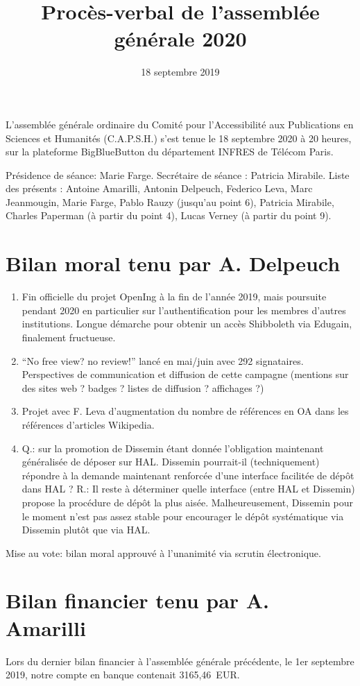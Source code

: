 \documentclass[a4paper]{article}
\title{Procès-verbal de l'assemblée générale 2020}
\date{18 septembre 2019}
\begin{document}
\maketitle

L'assemblée générale ordinaire du Comité pour l'Accessibilité aux Publications en Sciences et Humanités (C.A.P.S.H.) s'est tenue le 18 septembre 2020 à 20 heures, sur la plateforme BigBlueButton du département INFRES de Télécom Paris. 

Présidence de séance: Marie Farge.
Secrétaire de séance : Patricia Mirabile.
Liste des présents : Antoine Amarilli, Antonin Delpeuch, Federico Leva, Marc Jeanmougin, Marie Farge, Pablo Rauzy (jusqu'au point 6), Patricia Mirabile, Charles Paperman (à partir du point 4), Lucas Verney (à partir du point 9).
    
\section{Bilan moral tenu par A. Delpeuch}

\begin{enumerate}
\item Fin officielle du projet OpenIng à la fin de l'année 2019, mais poursuite pendant 2020 en particulier sur l'authentification pour les membres d'autres institutions. Longue démarche pour obtenir un accès Shibboleth via Edugain, finalement fructueuse. 
\item ``No free view? no review!'' lancé en mai/juin avec 292 signataires. Perspectives de communication et diffusion de cette campagne (mentions sur des sites web ? badges ? listes de diffusion ? affichages ?)
\item Projet avec F. Leva d'augmentation du nombre de références en OA dans les références d'articles Wikipedia. 
\item Q.: sur la promotion de Dissemin étant donnée l'obligation maintenant généralisée de déposer sur HAL. Dissemin pourrait-il (techniquement) répondre à la demande maintenant renforcée d'une interface facilitée de dépôt dans HAL ? R.: Il reste à déterminer quelle interface (entre HAL et Dissemin) propose la procédure de dépôt la plus aisée. Malheureusement, Dissemin pour le moment n'est pas assez stable pour encourager le dépôt systématique via Dissemin plutôt que via HAL. 
\end{enumerate}
  
Mise au vote: bilan moral approuvé à l'unanimité via scrutin électronique.

\section{Bilan financier tenu par A. Amarilli}
Lors du dernier bilan financier à l'assemblée générale précédente, le 1er septembre 2019, notre compte en banque contenait 3165,46~EUR.
\end{document}
